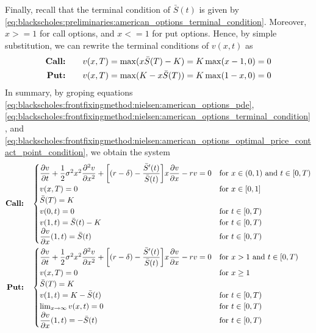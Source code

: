 Finally, recall that the terminal condition of $\bar{S}(t)$ is given by \eqref{eq:blackscholes:preliminaries:american_options_terminal_condition}. Moreover,
$x>=1$ for call options, and $x<=1$ for put options. Hence, by simple substitution, we can rewrite the terminal conditions of $v(x, t)$ as
\begin{subequations} \label{eq:blackscholes:frontfixingmethod:nielsen:american_options_terminal_condition}
  \begin{align}
    \text{\textbf{Call:}} \qquad & v(x, T) = \max(x\bar{S}(T) - K) = K \max(x - 1, 0) = 0 \\
    \text{\textbf{Put:}} \qquad & v(x, T) = \max(K - x\bar{S}(T)) = K \max(1 - x, 0) = 0
  \end{align}
\end{subequations}
In summary, by groping equations
\eqref{eq:blackscholes:frontfixingmethod:nielsen:american_options_pde},
\eqref{eq:blackscholes:frontfixingmethod:nielsen:american_options_terminal_condition}, and
\eqref{eq:blackscholes:frontfixingmethod:nielsen:american_options_optimal_price_contact_point_condition},
we obtain the system
\begin{subequations} \label{eq:blackscholes:frontfixingmethod:nielsen:american_options_bs_pde}
  \begin{align}
    \text{\textbf{Call:}} \quad &
    \begin{cases}
      \dfrac{\partial{v}}{\partial{t}} + \dfrac{1}{2}\sigma^{2} x^2 \dfrac{\partial^2{v}}{\partial{x}^2} + \bigg[(r - \delta) -
      \dfrac{\bar{S}^\prime(t)}{\bar{S}(t)}\bigg]x\dfrac{\partial{v}}{\partial{x}} - rv = 0 & \text{for $x \in (0, 1)$ and $t \in [0, T)$} \\ 
      v(x, T) = 0 & \text{for $x\in[0, 1]$}  \\
      \bar{S}(T) = K \\ 
      v(0, t) = 0 & \text{for $t\in[0, T)$}\\ 
      v(1, t) = \bar{S}(t) - K & \text{for $t\in[0, T)$}\\ 
      \dfrac{\partial{v}}{\partial{x}}(1, t) = \bar{S}(t) & \text{for $t\in[0, T)$}
    \end{cases}\\
    \text{\textbf{Put:}} \quad &
    \begin{cases}
      \dfrac{\partial{v}}{\partial{t}} + \dfrac{1}{2}\sigma^{2} x^2 \dfrac{\partial^2{v}}{\partial{x}^2} + \bigg[(r - \delta) -
      \dfrac{\bar{S}^\prime(t)}{\bar{S}(t)}\bigg]x\dfrac{\partial{v}}{\partial{x}} - rv = 0 & \text{for $x > 1$ and $t \in [0, T)$} \\ 
      v(x, T) = 0 & \text{for $x \ge 1$} \\
      \bar{S}(T) = K \\ 
      v(1, t) = K - \bar{S}(t) & \text{for $t\in[0, T)$} \\
      \lim_{x\rightarrow\infty}v(x, t) = 0 & \text{for $t\in[0, T)$} \\
      \dfrac{\partial{v}}{\partial{x}}(1, t) = -\bar{S}(t) & \text{for $t\in[0, T)$}
    \end{cases}
  \end{align}
\end{subequations}
